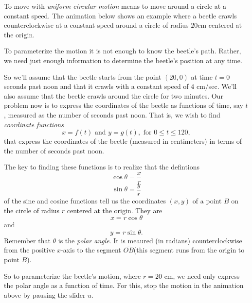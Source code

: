 \documentclass{ximera}
\begin{document}
\begin{exploration}

To move with \emph{uniform circular motion} means to move around a circle at a constant speed. The animation below shows an example where a beetle crawls counterclockwise at a constant speed around a circle of radius $20$cm centered at the origin.

 
\begin{onlineOnly}
    \begin{center}
\end{center}
\end{onlineOnly}
\end{exploration}

To parameterize the motion it is not enough to know the beetle's path. Rather, we need just enough information to determine the beetle's position at any time.

So we'll assume that the beetle starts from the point $(20,0)$ at time $t=0$ seconds past noon and that it crawls with a constant speed of $4$ cm/sec. We'll also assume that the beetle crawls around the circle for two minutes. Our problem now is to express the coordinates of the beetle as functions of time, say $t$, measured as the number of seconds past noon. That is, we wish to find \emph{coordinate functions}
\[
   x = f(t) \text{ and } y=g(t) , \text{ for } 0\leq t \leq 120 ,
\]
that express the coordinates of the beetle (measured in centimeters) in terms of the number of seconds past noon.

The key to finding these functions is to realize that the defintions
\[
    \cos \theta = \frac{x}{r}
\]
\[
    \sin\theta = \frac{y}{r}
\]
of the sine and cosine functions tell us the coordinates $(x,y)$ of a point $B$ on the circle of radius $r$ centered at the origin. They are 
\[
    x = r\cos\theta
\]
and 
\[
   y= r\sin \theta .
\]
Remember that $\theta$ is the \emph{polar angle}. It is meaured (in radians) counterclockwise from the positive $x$-axis to the segment $\overline{OB}$(this segment runs from the origin to point $B$).

So to parameterize the beetle's motion, where $r=20$ cm, we need only express the polar angle as a function of time. For this, stop the motion in the animation above by pausing the slider $u$. 
\end{document}
